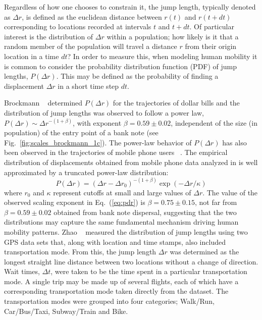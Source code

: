 Regardless of how one chooses to constrain it, the jump length, typically denoted as $\Delta r$, is defined as the euclidean distance between $r(t)$ and $r(t+dt)$ corresponding to locations  recorded at intervals $t$ and $t+dt$. Of particular interest is the distribution of $\Delta r$ within a population; how likely is it that a random member of the population will travel a distance $r$ from their origin location in a time $dt$? In order to measure this, when modeling human mobility it is common to consider the probability distribution function (PDF) of jump lengths, $P(\Delta r)$. This may be defined as the probability of finding a displacement $\Delta r$ in a short time step $dt$. %

Brockmann \et~\cite{brockmann_2006_scaling} determined $P(\Delta r)$ for the trajectories of dollar bills and the distribution of jump lengths was observed to follow a power law, $P(\Delta r) \sim \Delta r^{-(1 + \beta)}$, with exponent $\beta = 0.59 \pm 0.02$, independent of the size (in population) of the entry point of a bank note (see Fig.~\ref{fig:scales_brockmann_1c}).
The power-law behavior of $P(\Delta r)$ has also been observed in the trajectories of mobile phone users ~\cite{gonzalez_2008_understanding, song_2010_modelling}.  
The empirical distribution of displacements obtained from mobile phone data analyzed in \cite{gonzalez_2008_understanding} is well approximated by a truncated power-law distribution: 
%
\begin{equation}\label{eq:pdr}
P(\Delta r) = (\Delta r - \Delta r_0)^{-(1 + \beta)} \exp{(- \Delta r / \kappa)}
\end{equation}
%
where $r_0$ and $\kappa$ represent cutoffs at small and large values of $\Delta r$. 
The value of the observed scaling exponent in Eq.~(\ref{eq:pdr}) is $\beta = 0.75 \pm 0.15$, 
not far from $\beta = 0.59 \pm 0.02$ obtained from bank note dispersal, suggesting that the two distributions may capture the same fundamental mechanism driving human mobility patterns. 
Zhao \et ~\cite{zhao_2015_explaining} measured the distribution of jump lengths using two GPS data sets that, along with location and time stamps, also included transportation mode. From this, the jump length $\Delta r$ was determined as the longest straight line distance between two locations without a change of direction. Wait times, $\Delta t$, were taken to be the time spent in a particular transportation mode. A single trip may be made up of several flights, each of which have a corresponding transportation mode taken directly from the dataset. The transportation modes were grouped into four categories; Walk/Run, Car/Bus/Taxi, Subway/Train and Bike.
